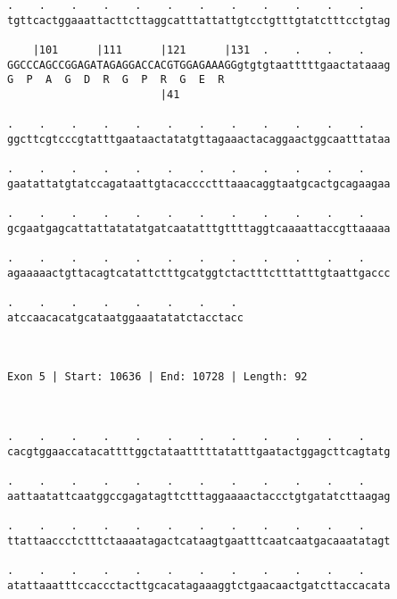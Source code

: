 \documentclass{article}
\begin{document}
\begin{Verbatim}
.    .    .    .    .    .    .    .    .    .    .    .    
tgttcactggaaattacttcttaggcatttattattgtcctgtttgtatctttcctgtag
                                                            
    |101      |111      |121      |131  .    .    .    .    
GGCCCAGCCGGAGATAGAGGACCACGTGGAGAAAGGgtgtgtaatttttgaactataaag
G  P  A  G  D  R  G  P  R  G  E  R                          
                        |41                                 
  
.    .    .    .    .    .    .    .    .    .    .    .    
ggcttcgtcccgtatttgaataactatatgttagaaactacaggaactggcaatttataa
                                                            
.    .    .    .    .    .    .    .    .    .    .    .    
gaatattatgtatccagataattgtacacccctttaaacaggtaatgcactgcagaagaa
                                                            
.    .    .    .    .    .    .    .    .    .    .    .    
gcgaatgagcattattatatatgatcaatatttgttttaggtcaaaattaccgttaaaaa
                                                            
.    .    .    .    .    .    .    .    .    .    .    .    
agaaaaactgttacagtcatattctttgcatggtctactttctttatttgtaattgaccc
                                                            
.    .    .    .    .    .    .    . 
atccaacacatgcataatggaaatatatctacctacc
                                     
                                     
 
Exon 5 | Start: 10636 | End: 10728 | Length: 92



.    .    .    .    .    .    .    .    .    .    .    .    
cacgtggaaccatacattttggctataatttttatatttgaatactggagcttcagtatg
                                                            
.    .    .    .    .    .    .    .    .    .    .    .    
aattaatattcaatggccgagatagttctttaggaaaactaccctgtgatatcttaagag
                                                            
.    .    .    .    .    .    .    .    .    .    .    .    
ttattaaccctctttctaaaatagactcataagtgaatttcaatcaatgacaaatatagt
                                                            
.    .    .    .    .    .    .    .    .    .    .    .    
atattaaatttccaccctacttgcacatagaaaggtctgaacaactgatcttaccacata
                                                            

\end{Verbatim}
\end{document}
